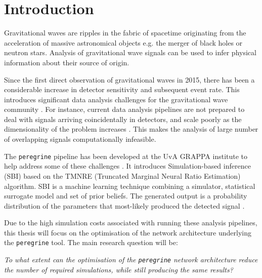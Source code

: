 \section{Introduction}
\label{sec:introduction}
Gravitational waves are ripples in the fabric of spacetime originating from the acceleration of massive astronomical objects e.g. the merger of black holes or neutron stars. Analysis of gravitational wave signals can be used to infer physical information about their source of origin. 

Since the first direct observation of gravitational waves in 2015, there has been a considerable increase in detector sensitivity and subsequent event rate. This introduces significant data analysis challenges for the gravitational wave community \cite{bhardwaj2023peregrine}.
For instance, current data analysis pipelines are not prepared to deal with signals arriving coincidentally in detectors, and scale poorly as the dimensionality of the problem increases \cite{alvey2023things}. This makes the analysis of large number of overlapping signals computationally infeasible.

The \texttt{peregrine} pipeline has been developed at the UvA GRAPPA institute to help address some of these challenges \cite{bhardwaj2023peregrine}. It introduces Simulation-based inference (SBI) based on the TMNRE (Truncated Marginal Neural Ratio Estimation) algorithm. SBI is a machine learning technique combining a simulator, statistical surrogate model and set of prior beliefs. The generated output is a probability distribution of the parameters that most-likely produced the detected signal  \cite{Miller2022}.

Due to the high simulation costs associated with running these analysis pipelines, this thesis will focus on the optimisation of the network architecture underlying the \texttt{peregrine} tool. The main research question will be: 

\textit{To what extent can the optimisation of the \texttt{peregrine} network architecture reduce the number of required simulations, while still producing the same results?}
